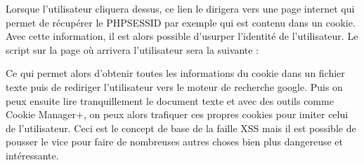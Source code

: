 \documentclass{article}
\begin{document}
Lorsque l'utilisateur cliquera dessus, ce lien le dirigera vers une page internet qui permet de récupérer le PHPSESSID par exemple qui est contenu dans un cookie. Avec cette information, il est alors possible d'usurper l'identité de l'utilisateur. Le script sur la page où arrivera l'utilisateur sera la suivante :
\vspace{0.2cm}\\
\vspace{0.2cm}

Ce qui permet alors d'obtenir toutes les informations du cookie dans un fichier texte puis de rediriger l'utilisateur vers le moteur de recherche google. Puis on peux ensuite lire tranquillement le document texte et avec des outils comme Cookie Manager+, on peux alors trafiquer ces propres cookies pour imiter celui de l'utilisateur. Ceci est le concept de base de la faille XSS mais il est possible de pousser le vice pour faire de nombreuses autres choses bien plus dangereuse et intéressante.\\
\end{document}
